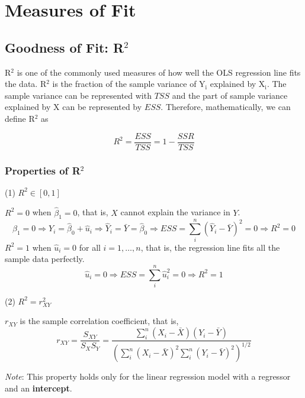 \documentclass[a4paper,11pt]{article}
\begin{document}
\section{Measures of Fit}
\label{sec:org5e5049c}
\subsection{Goodness of Fit: R\(^{\text{2}}\)}
\label{sec:org74eb97a}

R\(^{\text{2}}\) is one of the commonly used measures of how well the OLS
regression line fits the data. R\(^{\text{2}}\) is the fraction of the sample
variance of Y\(_{\text{i}}\) explained by X\(_{\text{i}}\). The sample variance can be
represented with \(TSS\) and the part of sample variance explained by X
can be represented by \(ESS\). Therefore, mathematically, we can define
R\(^{\text{2}}\) as

\begin{equation}
\label{eq:rsquared}
R^2 = \frac{ESS}{TSS} = 1 - \frac{SSR}{TSS}
\end{equation}

\subsubsection*{Properties of R\(^{\text{2}}\)}
\label{sec:org250d906}

(1) \(R^2 \in [0, 1]\)

\(R^2 = 0\) when \(\hat{\beta}_1 = 0\), that is, \(X\) cannot explain the
variance in \(Y\).
\begin{equation*}
\hat{\beta}_1 = 0 \Rightarrow Y_i = \hat{\beta}_0 + \hat{u}_i
\Rightarrow \hat{Y}_i = \bar{Y} = \hat{\beta}_0 \Rightarrow ESS
= \sum_i^n (\hat{Y}_i - \bar{Y})^2 = 0 \Rightarrow R^2 = 0
\end{equation*}
\(R^2 = 1\) when \(\hat{u}_i = 0\) for all \(i = 1, \ldots, n\), that is,
the regression line fits all the sample data perfectly.
\[ \hat{u}_i = 0 \Rightarrow ESS = \sum_i^n \hat{u}_i^2 = 0
  \Rightarrow R^2 = 1 \]

(2) \(R^2 = r^2_{XY}\)

\(r_{XY}\) is the sample correlation coefficient, that is,
\[ r_{XY} = \frac{S_{XY}}{S_X S_Y} = \frac{\sum_i^n(X_i -
  \bar{X})(Y_i - \bar{Y})}{(\sum_i^n (X_i - \bar{X})^2 \sum_i^n (Y_i -
  \bar{Y})^2)^{1/2}} \]

\emph{Note}: This property holds only for the linear regression model
with a regressor and an \textbf{intercept}.
\end{document}
